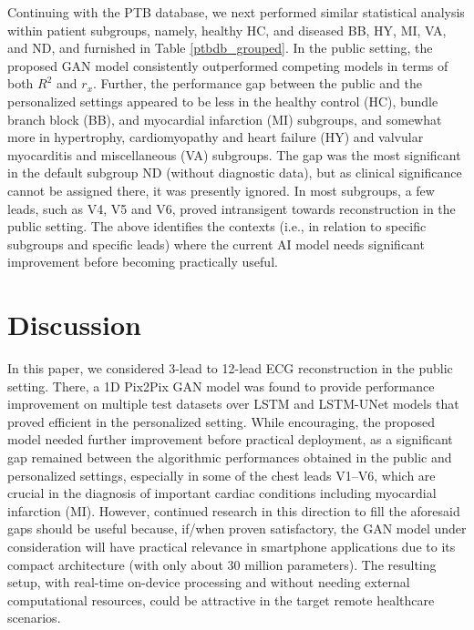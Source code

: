 \documentclass[conference]{IEEEtran}
\begin{document}
Continuing with the PTB database, we next performed similar statistical analysis within patient subgroups, namely, healthy HC, and diseased BB, HY, MI, VA, and ND, and furnished in Table \ref{ptbdb_grouped}. In the public setting, the proposed GAN model consistently outperformed competing models in terms of both $R^2$ and $r_x$. Further, the performance gap between the public and the personalized settings appeared to be less in the healthy control (HC), bundle branch block (BB), and myocardial infarction (MI) subgroups, and somewhat more in hypertrophy, cardiomyopathy and heart failure (HY) and valvular myocarditis and miscellaneous (VA) subgroups. The gap was the most significant in the default subgroup ND (without diagnostic data), but as
clinical significance cannot be assigned there, it was presently ignored. In most subgroups, a few leads, such as V4, V5 and V6, proved intransigent towards reconstruction in the public setting. The above identifies the contexts (i.e., in relation to specific subgroups and specific leads) where the current AI model needs significant improvement before becoming practically useful. 



\section{Discussion}

In this paper, we considered 3-lead to 12-lead ECG reconstruction in the public setting. There, a 1D Pix2Pix GAN model was found to provide performance improvement on multiple test datasets over LSTM and LSTM-UNet models that proved efficient in the personalized setting. While encouraging, the proposed model needed further improvement before practical deployment, as a significant gap remained between the algorithmic performances obtained in the public and personalized settings, especially in some of the chest leads V1--V6, which are crucial in the diagnosis of important cardiac conditions including myocardial infarction (MI). However, continued research in this direction to fill the aforesaid gaps should be useful because, if/when proven satisfactory, the GAN model under consideration will have practical relevance in smartphone applications due to its compact architecture (with only about 30 million parameters). The resulting setup, with real-time on-device processing and without needing external computational resources, could be attractive in the target remote healthcare scenarios.
\end{document}
